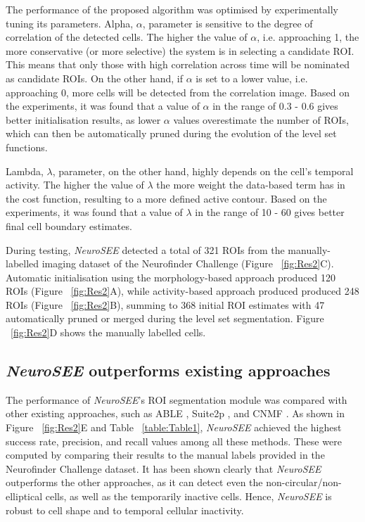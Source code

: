 The performance of the proposed algorithm was optimised by experimentally tuning its parameters. Alpha, $\alpha$, parameter is sensitive to the degree of correlation of the detected cells. The higher the value of $\alpha$, i.e. approaching 1, the more conservative (or more selective) the system is in selecting a candidate ROI. This means that only those with high correlation across time will be nominated as candidate ROIs. On the other hand, if $\alpha$ is set to a lower value, i.e. approaching 0, more cells will be detected from the correlation image. Based on the experiments, it was found that a value of $\alpha$ in the range of 0.3 - 0.6 gives better initialisation results, as lower $\alpha$ values overestimate the number of ROIs, which can then be automatically pruned during the evolution of the level set functions. 

Lambda, $\lambda$, parameter, on the other hand, highly depends on the cell’s temporal activity. The higher the value of $\lambda$ the more weight the data-based term has in the cost function, resulting to a more defined active contour. Based on the experiments, it was found that a value of $\lambda$ in the range of 10 - 60 gives better final cell boundary estimates.

During testing, \textit{NeuroSEE} detected a total of 321 ROIs from the manually-labelled imaging dataset of the Neurofinder Challenge (Figure ~\ref{fig:Res2}C). Automatic initialisation using the morphology-based approach produced 120 ROIs (Figure ~\ref{fig:Res2}A), while activity-based approach produced produced 248 ROIs (Figure ~\ref{fig:Res2}B), summing to 368 initial ROI estimates with 47 automatically pruned or merged during the level set segmentation. Figure ~\ref{fig:Res2}D shows the manually labelled cells. 

\subsection{\textit{NeuroSEE} outperforms existing approaches}
\hspace{\parindent} The performance of \textit{NeuroSEE}'s ROI segmentation module was compared with other existing approaches, such as ABLE \cite{reynolds2017able}, Suite2p \cite{pachitariu2016suite2p}, and CNMF \cite{pnevmatikakis2016simultaneous}. As shown in Figure ~\ref{fig:Res2}E and Table ~\ref{table:Table1}, \textit{NeuroSEE} achieved the highest success rate, precision, and recall values among all these methods. These were computed by comparing their results to the manual labels provided in the Neurofinder Challenge dataset. It has been shown clearly that \textit{NeuroSEE} outperforms the other approaches, as it can detect even the non-circular/non-elliptical cells, as well as the temporarily inactive cells. Hence, \textit{NeuroSEE} is robust to cell shape and to temporal cellular inactivity. 


